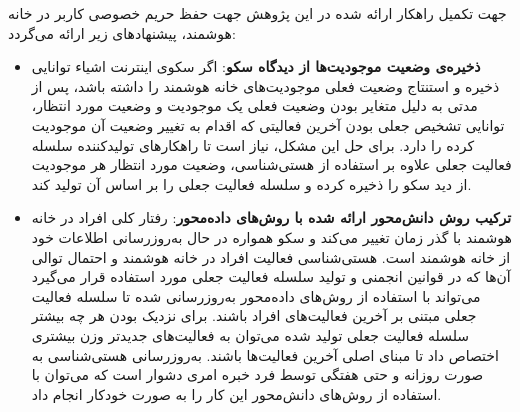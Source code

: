 جهت تکمیل راهکار ارائه شده در این پژوهش جهت حفظ حریم خصوصی کاربر در خانه هوشمند، پیشنهادهای زیر ارائه می‌گردد:

\begin{itemize}
\item \textbf{ذخیره‌ی وضعیت موجودیت‌ها از دیدگاه سکو}: اگر سکوی اینترنت اشیاء توانایی ذخیره و استنتاج وضعیت فعلی موجودیت‌های خانه هوشمند را داشته باشد، پس از مدتی به دلیل متغایر بودن وضعیت فعلی یک موجودیت و وضعیت مورد انتظار، توانایی تشخیص جعلی بودن آخرین فعالیتی که اقدام به تغییر وضعیت آن موجودیت کرده را دارد. برای حل این مشکل، نیاز است تا راهکارهای تولیدکننده سلسله فعالیت جعلی علاوه بر استفاده از هستی‌شناسی، وضعیت مورد انتظار هر موجودیت از دید سکو را ذخیره کرده و سلسله فعالیت جعلی را بر اساس آن تولید کند.
\item \textbf{ترکیب روش دانش‌محور ارائه شده با روش‌های داده‌محور}: رفتار کلی افراد در خانه هوشمند با گذر زمان تغییر می‌کند و سکو همواره در حال به‌روزرسانی اطلاعات خود از خانه هوشمند است. هستی‌شناسی فعالیت افراد در خانه هوشمند و احتمال توالی آن‌ها که در قوانین انجمنی و تولید سلسله فعالیت جعلی مورد استفاده قرار می‌گیرد می‌تواند با استفاده از روش‌های داده‌محور به‌روزرسانی شده تا سلسله فعالیت جعلی مبتنی بر آخرین فعالیت‌های افراد باشند. برای نزدیک بودن هر چه بیشتر سلسله فعالیت‌ جعلی تولید شده می‌توان به فعالیت‌های جدیدتر وزن بیشتری اختصاص داد تا مبنای اصلی آخرین فعالیت‌ها باشند. به‌روزرسانی هستی‌شناسی به صورت روزانه و حتی هفتگی توسط فرد خبره امری دشوار است که می‌توان با استفاده از روش‌های دانش‌محور این کار را به صورت خودکار انجام داد.
‌\end{itemize}
